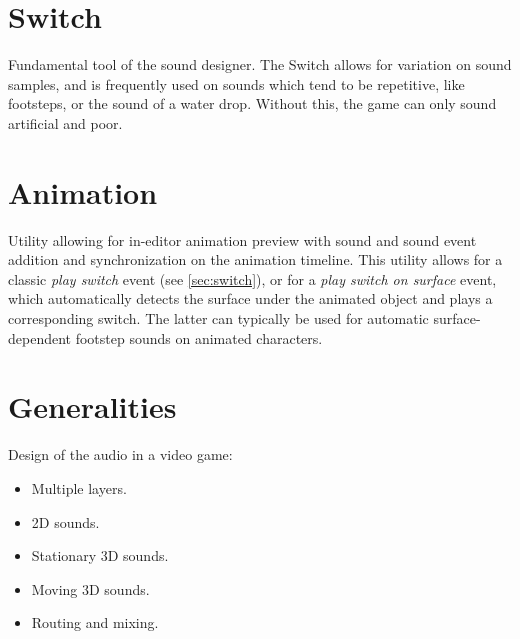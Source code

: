 \documentclass[a4paper,twoside,10pt]{article}
\begin{document}
\section{Switch} \label{sec:switch}

Fundamental tool of the sound designer. The Switch allows for variation on sound samples, and is frequently used on sounds which tend to be repetitive, like footsteps, or the sound of a water drop. Without this, the game can only sound artificial and poor.

\section{Animation}

Utility allowing for in-editor animation preview with sound and sound event addition and synchronization on the animation timeline. This utility allows for a classic \textit{play switch} event (see \autoref{sec:switch}), or for a \textit{play switch on surface} event, which automatically detects the surface under the animated object and plays a corresponding switch. The latter can typically be used for automatic surface-dependent footstep sounds on animated characters.


\section{Generalities} \label{sec:gen}

Design of the audio in a video game: \begin{itemize}
\item Multiple layers.
\item 2D sounds.
\item Stationary 3D sounds.
\item Moving 3D sounds.
\item Routing and mixing.
\end{itemize}


\appendix
\end{document}
